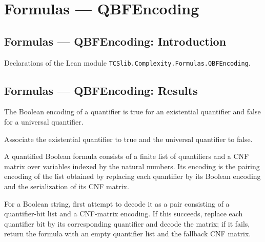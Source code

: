 \section{Formulas --- QBFEncoding}
\subsection*{Formulas --- QBFEncoding: Introduction}

Declarations of the Lean module \texttt{TCSlib.Complexity.Formulas.QBFEncoding}.

\subsection*{Formulas --- QBFEncoding: Results}

\begin{definition}
\label{Complexity.QBF.quantBit}
\leanok
{}
The Boolean encoding of a quantifier is true for an existential quantifier and false for
a universal quantifier.
\end{definition}

\begin{definition}
\label{Complexity.QBF.quantOfBit}
\leanok
{}
Associate the existential quantifier to true and the universal quantifier to false.
\end{definition}

\begin{definition}
\label{Complexity.QBF.encode}
\leanok
{}
A quantified Boolean formula consists of a finite list of quantifiers and a CNF matrix
over variables indexed by the natural numbers. Its encoding is the pairing encoding of
the list obtained by replacing each quantifier by its Boolean encoding and the
serialization of its CNF matrix.
\end{definition}

\begin{definition}
\label{Complexity.QBF.decode}
\leanok
{}
For a Boolean string, first attempt to decode it as a pair consisting of a
quantifier-bit list and a CNF-matrix encoding. If this succeeds, replace each quantifier
bit by its corresponding quantifier and decode the matrix; if it fails, return the
formula with an empty quantifier list and the fallback CNF matrix.
\end{definition}

